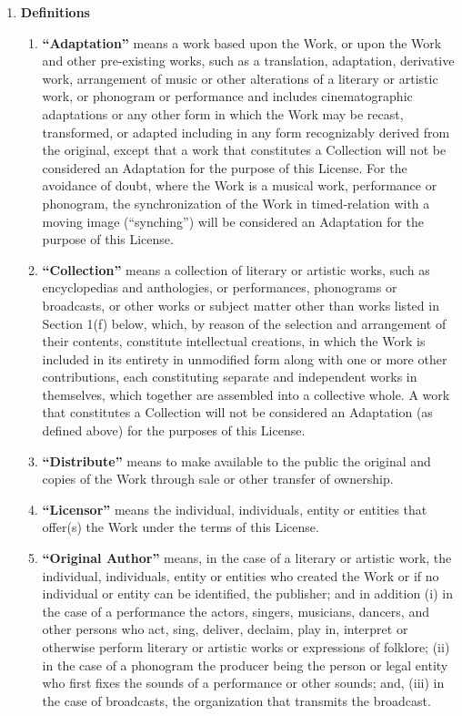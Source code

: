 \begin{enumerate} 
  \item {\textbf{Definitions}}
  \begin {enumerate}
    \item {\textbf{``Adaptation''} means a work based upon the Work, or upon the
    Work and other pre-existing works, such as a translation, adaptation,
    derivative work, arrangement of music or other alterations of a literary or
    artistic work, or phonogram or performance and includes cinematographic
    adaptations or any other form in which the Work may be recast, transformed,
    or adapted including in any form recognizably derived from the original,
    except that a work that constitutes a Collection will not be considered an
    Adaptation for the purpose of this License. For the avoidance of doubt,
    where the Work is a musical work, performance or phonogram, the
    synchronization of the Work in timed-relation with a moving image
    (``synching'') will be considered an Adaptation for the purpose of this
    License.}

    \item {\textbf{``Collection''} means a collection of literary or artistic
    works, such as encyclopedias and anthologies, or performances, phonograms or
    broadcasts, or other works or subject matter other than works listed in
    Section 1(f) below, which, by reason of the selection and arrangement of
    their contents, constitute intellectual creations, in which the Work is
    included in its entirety in unmodified form along with one or more other
    contributions, each constituting separate and independent works in
    themselves, which together are assembled into a collective whole. A work
    that constitutes a Collection will not be considered an Adaptation (as
    defined above) for the purposes of this License.}

    \item {\textbf{``Distribute''} means to make available to the public the
    original and copies of the Work through sale or other transfer of
    ownership.}

    \item {\textbf{``Licensor''} means the individual, individuals, entity or
    entities that offer(s) the Work under the terms of this License.}

    \item {\textbf{``Original Author''} means, in the case of a literary or
    artistic work, the individual, individuals, entity or entities who created
    the Work or if no individual or entity can be identified, the publisher; and
    in addition (i) in the case of a performance the actors, singers, musicians,
    dancers, and other persons who act, sing, deliver, declaim, play in,
    interpret or otherwise perform literary or artistic works or expressions of
    folklore; (ii) in the case of a phonogram the producer being the person or
    legal entity who first fixes the sounds of a performance or other sounds;
    and, (iii) in the case of broadcasts, the organization that transmits the
    broadcast.}


\end{enumerate}
\end{enumerate}
